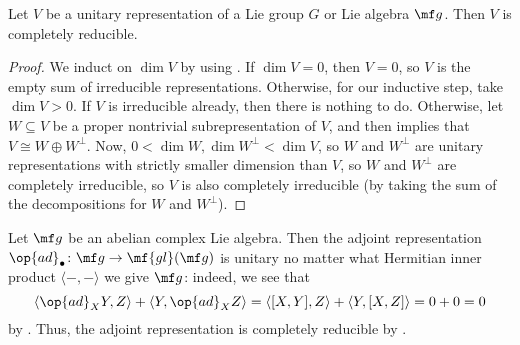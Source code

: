 \documentclass[../notes.tex]{subfiles}
\begin{document}
\begin{corollary} \label{cor:unitary-reduces}
	Let $V$ be a unitary representation of a Lie group $G$ or Lie algebra $\mf g$. Then $V$ is completely reducible.
\end{corollary}
\begin{proof}
	We induct on $\dim V$ by using . If $\dim V=0$, then $V=0$, so $V$ is the empty sum of irreducible representations. Otherwise, for our inductive step, take $\dim V>0$. If $V$ is irreducible already, then there is nothing to do. Otherwise, let $W\subseteq V$ be a proper nontrivial subrepresentation of $V$, and then  implies that $V\cong W\oplus W^\perp$. Now, $0<\dim W,\dim W^\perp<\dim V$, so $W$ and $W^\perp$ are unitary representations with strictly smaller dimension than $V$, so $W$ and $W^\perp$ are completely irreducible, so $V$ is also completely irreducible (by taking the sum of the decompositions for $W$ and $W^\perp$).
\end{proof}
\begin{example}
	Let $\mf g$ be an abelian complex Lie algebra. Then the adjoint representation $\op{ad}_\bullet\colon\mf g\to\mf{gl}(\mf g)$ is unitary no matter what Hermitian inner product $\langle-,-\rangle$ we give $\mf g$: indeed, we see that
	\[\langle\op{ad}_XY,Z\rangle+\langle Y,\op{ad}_XZ\rangle=\langle[X,Y],Z\rangle+\langle Y,[X,Z]\rangle=0+0=0\]
	by . Thus, the adjoint representation is completely reducible by .
\end{example}
\end{document}
